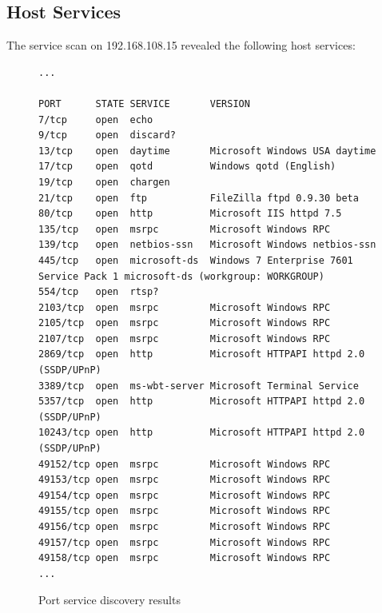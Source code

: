 \documentclass[11pt, oneside]{article}   	%
\begin{document}
\subsection{Host Services}

The service scan on 192.168.108.15 revealed the following host services:

\begin{figure}[h!!]
	\fontsize{8pt}{4pt}
	\begin{verbatim}
...

PORT      STATE SERVICE       VERSION
7/tcp     open  echo
9/tcp     open  discard?
13/tcp    open  daytime       Microsoft Windows USA daytime
17/tcp    open  qotd          Windows qotd (English)
19/tcp    open  chargen
21/tcp    open  ftp           FileZilla ftpd 0.9.30 beta
80/tcp    open  http          Microsoft IIS httpd 7.5
135/tcp   open  msrpc         Microsoft Windows RPC
139/tcp   open  netbios-ssn   Microsoft Windows netbios-ssn
445/tcp   open  microsoft-ds  Windows 7 Enterprise 7601 Service Pack 1 microsoft-ds (workgroup: WORKGROUP)
554/tcp   open  rtsp?
2103/tcp  open  msrpc         Microsoft Windows RPC
2105/tcp  open  msrpc         Microsoft Windows RPC
2107/tcp  open  msrpc         Microsoft Windows RPC
2869/tcp  open  http          Microsoft HTTPAPI httpd 2.0 (SSDP/UPnP)
3389/tcp  open  ms-wbt-server Microsoft Terminal Service
5357/tcp  open  http          Microsoft HTTPAPI httpd 2.0 (SSDP/UPnP)
10243/tcp open  http          Microsoft HTTPAPI httpd 2.0 (SSDP/UPnP)
49152/tcp open  msrpc         Microsoft Windows RPC
49153/tcp open  msrpc         Microsoft Windows RPC
49154/tcp open  msrpc         Microsoft Windows RPC
49155/tcp open  msrpc         Microsoft Windows RPC
49156/tcp open  msrpc         Microsoft Windows RPC
49157/tcp open  msrpc         Microsoft Windows RPC
49158/tcp open  msrpc         Microsoft Windows RPC
...
	\end{verbatim}
	\caption{Port service discovery results}
\end{figure}
\end{document}

